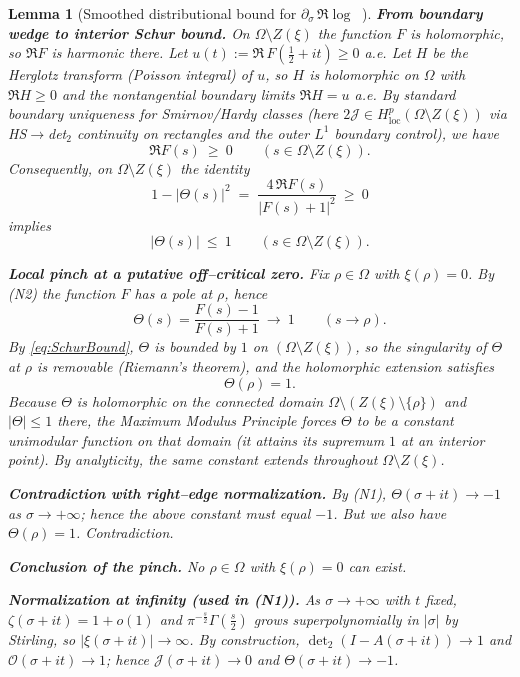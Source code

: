 \documentclass[11pt]{article}
\newtheorem{lemma}[theorem]{Lemma}
\theoremstyle{definition}
\theoremstyle{remark}
\DeclareMathOperator{\dettwo}{det_2}
\begin{document}
\begin{lemma}[Smoothed distributional bound for $\partial_\sigma\,\Re\log\dettwo$]
\medskip
\noindent\textbf{From boundary wedge to interior Schur bound.}
On $\Omega\setminus Z(\xi)$ the function $F$ is holomorphic, so $\Re F$ is harmonic there.
Let $u(t):=\Re\,F(\tfrac12+it)\ge0$ a.e.
Let $H$ be the Herglotz transform (Poisson integral) of $u$, so $H$ is holomorphic on $\Omega$
with $\Re H\ge0$ and the nontangential boundary limits $\Re H=u$ a.e.
By standard boundary uniqueness for Smirnov/Hardy classes (here $2\mathcal J\in H^p_{\mathrm{loc}}(\Omega\setminus Z(\xi))$ via HS$\to$det$_2$ continuity on rectangles and the outer $L^1$ boundary control), we have
\[
\Re F(s)\ \ge\ 0\qquad(s\in\Omega\setminus Z(\xi)).
\tag{H+}
\label{eq:Hplus}
\]
Consequently, on $\Omega\setminus Z(\xi)$ the identity
\[
1-|\Theta(s)|^2\;=\;\frac{4\,\Re F(s)}{|F(s)+1|^2}\ \ge\ 0
\]
implies
\[
|\Theta(s)|\ \le\ 1\qquad(s\in\Omega\setminus Z(\xi)).
\tag{Schur}
\label{eq:SchurBound}
\]

\medskip
\noindent\textbf{Local pinch at a putative off--critical zero.}
Fix $\rho\in\Omega$ with $\xi(\rho)=0$.
By (N2) the function $F$ has a pole at $\rho$, hence
\[
\Theta(s)=\frac{F(s)-1}{F(s)+1}\ \longrightarrow\ 1\qquad(s\to\rho).
\]
By \eqref{eq:SchurBound}, $\Theta$ is bounded by $1$ on $(\Omega\setminus Z(\xi))$,
so the singularity of $\Theta$ at $\rho$ is removable (Riemann's theorem), and the holomorphic extension satisfies
\[
\Theta(\rho)=1.
\]
Because $\Theta$ is holomorphic on the connected domain $\Omega\setminus(Z(\xi)\setminus\{\rho\})$
and $|\Theta|\le1$ there, the Maximum Modulus Principle forces $\Theta$ to be
a \emph{constant unimodular} function on that domain (it attains its supremum $1$ at an interior point).
By analyticity, the same constant extends throughout $\Omega\setminus Z(\xi)$.

\medskip
\noindent\textbf{Contradiction with right--edge normalization.}
By (N1), $\Theta(\sigma+it)\to-1$ as $\sigma\to+\infty$; hence the above constant must equal $-1$.
But we also have $\Theta(\rho)=1$. Contradiction.

\medskip
\noindent\textbf{Conclusion of the pinch.}
No $\rho\in\Omega$ with $\xi(\rho)=0$ can exist.

\medskip
\noindent\textbf{Normalization at infinity (used in (N1)).}
As $\sigma\to+\infty$ with $t$ fixed, $\zeta(\sigma+it)=1+o(1)$ and
$\pi^{-\frac{s}{2}}\Gamma(\tfrac s2)$ grows superpolynomially in $|\sigma|$ by Stirling,
so $|\xi(\sigma+it)|\to\infty$.
By construction, $\det\nolimits_2(I-A(\sigma+it))\to1$ and $\mathcal O(\sigma+it)\to1$;
hence $\mathcal J(\sigma+it)\to0$ and $\Theta(\sigma+it)\to-1$.


\end{lemma}
\end{document}

